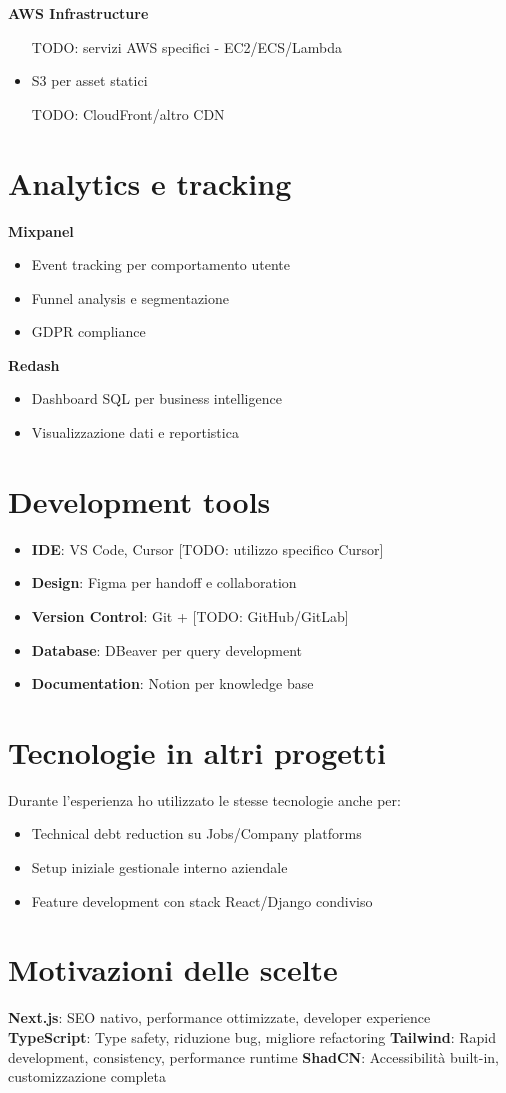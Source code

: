 \textbf{AWS Infrastructure}
\begin{itemize}
  \item [TODO: servizi AWS specifici - EC2/ECS/Lambda]
  \item S3 per asset statici
  \item [TODO: CloudFront/altro CDN]
\end{itemize}

\section{Analytics e tracking}
\textbf{Mixpanel}
\begin{itemize}
  \item Event tracking per comportamento utente
  \item Funnel analysis e segmentazione
  \item GDPR compliance
\end{itemize}

\textbf{Redash}
\begin{itemize}
  \item Dashboard SQL per business intelligence
  \item Visualizzazione dati e reportistica
\end{itemize}

\section{Development tools}
\begin{itemize}
  \item \textbf{IDE}: VS Code, Cursor [TODO: utilizzo specifico Cursor]
  \item \textbf{Design}: Figma per handoff e collaboration
  \item \textbf{Version Control}: Git + [TODO: GitHub/GitLab]
  \item \textbf{Database}: DBeaver per query development
  \item \textbf{Documentation}: Notion per knowledge base
\end{itemize}

\section{Tecnologie in altri progetti}
Durante l'esperienza ho utilizzato le stesse tecnologie anche per:
\begin{itemize}
  \item Technical debt reduction su Jobs/Company platforms
  \item Setup iniziale gestionale interno aziendale
  \item Feature development con stack React/Django condiviso
\end{itemize}

\section{Motivazioni delle scelte}
\textbf{Next.js}: SEO nativo, performance ottimizzate, developer experience
\textbf{TypeScript}: Type safety, riduzione bug, migliore refactoring
\textbf{Tailwind}: Rapid development, consistency, performance runtime
\textbf{ShadCN}: Accessibilità built-in, customizzazione completa